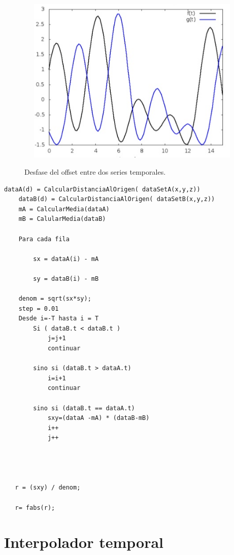 \begin{figure}[H]
\begin{center}
\label{fig:opciones de View}\includegraphics[height=8.0cm,width=12.0cm]{img/cap5/correlacionCruzada2.png}
\hspace{0.5cm}

\end{center}

\caption{Desfase del offset entre dos series temporales.}
\end{figure}
	                                
	\begin{lstlisting}[frame=single]
	dataA(d) = CalcularDistanciaAlOrigen( dataSetA(x,y,z))
	dataB(d) = CalcularDistanciaAlOrigen( dataSetB(x,y,z))
	mA = CalcularMedia(dataA)
	mB = CalularMedia(dataB)

	Para cada fila

   		sx = dataA(i) - mA

   		sy = dataB(i) - mB

   	denom = sqrt(sx*sy);
   	step = 0.01
   	Desde i=-T hasta i = T
   		Si ( dataB.t < dataB.t )
			j=j+1
    		continuar

    	sino si (dataB.t > dataA.t)
    		i=i+1
    		continuar

    	sino si (dataB.t == dataA.t)
    		sxy=(dataA -mA) * (dataB-mB)
        	i++
        	j++


   

   r = (sxy) / denom;

   r= fabs(r);
    \end{lstlisting}



\section{Interpolador temporal}

